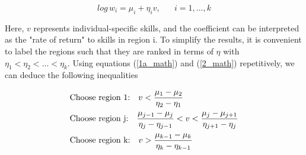 \documentclass{article}
\begin{document}
\begin{equation}\label{1a_math}
log\,w_{i} = \mu_{i} + \eta_{i}v, \hspace{20pt} i = 1,...,k \tag{1a}
\end{equation}

Here, $v$ represents individual-specific skills, and the coefficient can be interpreted as the "rate of return" to skills in region i. To simplify the results, it is convenient to label the regions such that they are ranked in terms of $\eta$ with $\eta_{1}<\eta_{2}<...<\eta_{k}$. Using equations (\ref{1a_math}) and (\ref{2_math}) repetitively, we can deduce the following inequalities



\begin{subequations}
\begin{align}
&\text{Choose region 1:\hspace{10pt}} v < \frac{\mu_{1}-\mu_{2}}{\eta_{2}-\eta_{1}}      \label{6a_math}\\
&\text{Choose region j:\hspace{10pt}} \frac{\mu_{j-1}-\mu_{j}}{\eta_{j}-\eta_{j-1}} < v < \frac{\mu_{j}-\mu_{j+1}}{\eta_{j+1}-\eta_{j}} \label{6b_math}  \\
&\text{Choose region k:\hspace{10pt}} v>\frac{\mu_{k-1}-\mu_{k}}{\eta_{k}-\eta_{k-1}}   \label{6c_math}
\end{align}
\end{subequations}
\end{document}
